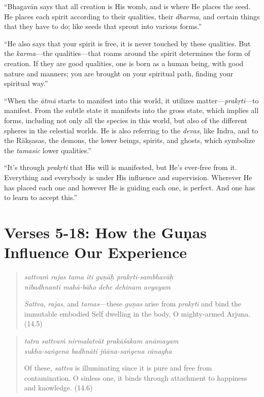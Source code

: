 \documentclass[12pt, twoside, openright]{memoir}
\begin{document}
\enquote{Bhagavān says that all creation is His womb, and is where He places the seed. He places each spirit according to their qualities, their \textit{dharma}, and certain things that they have to do; like seeds that sprout into various forms.}

\enquote{He also says that your spirit is free, it is never touched by these qualities. But the \textit{karma}---the qualities---that roams around the spirit determines the form of creation. If they are good qualities, one is born as a human being, with good nature and manners; you are brought on your spiritual path, finding your spiritual way.}

\enquote{When the \textit{ātmā} starts to manifest into this world, it utilizes matter---\textit{prakṛti}---to manifest. From the subtle state it manifests into the gross state, which implies all forms, including not only all the species in this world, but also of the different spheres in the celestial worlds. He is also referring to the \textit{devas}, like Indra, and to the Rākṣasas, the demons, the lower beings, spirits, and ghosts, which symbolize the \textit{tamasic} lower qualities.}

\enquote{It’s through \textit{prakṛti} that His will is manifested, but He’s ever-free from it. Everything and everybody is under His influence and supervision. Wherever He has placed each one and however He is guiding each one, is perfect. And one has to learn to accept this.}

\section{Verses 5-18: How the Guṇas Influence Our Experience}\label{sec-verses-5-18-how-the-gunas-influence-our-experience}


\par
\begin{verse}
\textit{sattvaṁ rajas tama iti guṇāḥ prakṛti-sambhavāḥ} \\
\textit{nibadhnanti mahā-bāho dehe dehinam avyayam}

\noindent \textit{Sattva}, \textit{rajas}, and \textit{tamas}---these \textit{guṇas} arise from \textit{prakṛti} and bind the immutable embodied Self dwelling in the body, O mighty-armed Arjuna. (14.5)
\end{verse}
\par



\par
\begin{verse}
\textit{tatra sattvaṁ nirmalatvāt prakāśakam anāmayam} \\
\textit{sukha-saṅgena badhnāti jñāna-saṅgena cānagha}

\noindent Of these, \textit{sattva} is illuminating since it is pure and free from contamination. O sinless one, it binds through attachment to happiness and knowledge. (14.6)
\end{verse}
\par
\end{document}
